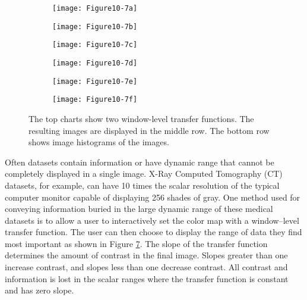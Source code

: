 \begin{figure}[htb]
	\begin{subfigure}[h]{0.48\linewidth}
		\texttt{[image: Figure10-7a]}
		\captionsetup{justification=centering}
		\caption*{}
		\label{fig:Figure10-7a}
	\end{subfigure}
	\hfill
	\begin{subfigure}[h]{0.48\linewidth}
		\texttt{[image: Figure10-7b]}
		\captionsetup{justification=centering}
		\caption*{}
		\label{fig:Figure10-7b}
	\end{subfigure}
	\hfill
	\begin{subfigure}[h]{0.48\linewidth}
		\texttt{[image: Figure10-7c]}
		\captionsetup{justification=centering}
		\caption*{}
		\label{fig:Figure10-7c}
	\end{subfigure}
	\hfill
	\begin{subfigure}[h]{0.48\linewidth}
		\texttt{[image: Figure10-7d]}
		\captionsetup{justification=centering}
		\caption*{}
		\label{fig:Figure10-7d}
	\end{subfigure}
	\hfill
	\begin{subfigure}[h]{0.48\linewidth}
		\texttt{[image: Figure10-7e]}
		\captionsetup{justification=centering}
		\caption*{}
		\label{fig:Figure10-7e}
	\end{subfigure}
	\hfill
	\begin{subfigure}[h]{0.48\linewidth}
		\texttt{[image: Figure10-7f]}
		\captionsetup{justification=centering}
		\caption*{}
		\label{fig:Figure10-7f}
	\end{subfigure}
	\caption{The top charts show two window-level transfer functions. The resulting images are displayed in the middle row. The bottom row shows image histograms of the images.}\label{fig:Figure10-7}
\end{figure}

Often datasets contain information or have dynamic range that cannot be completely displayed in a single image. X-Ray Computed Tomography (CT) datasets, for example, can have 10 times the scalar resolution of the typical computer monitor capable of displaying 256 shades of gray. One method used for conveying information buried in the large dynamic range of these medical datasets is to allow a user to interactively set the color map with a window--level transfer function. The user can then choose to display the range of data they find most important as shown in Figure \ref{fig:Figure10-7}. The slope of the transfer function determines the amount of contrast in the final image. Slopes greater than one increase contrast, and slopes less than one decrease contrast. All contrast and information is lost in the scalar ranges where the transfer function is constant and has zero slope.

